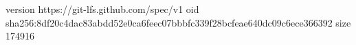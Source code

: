 version https://git-lfs.github.com/spec/v1
oid sha256:8df20c4dac83abdd52e0ca6feec07bbbfc339f28bcfeae640dc09c6ece366392
size 174916
